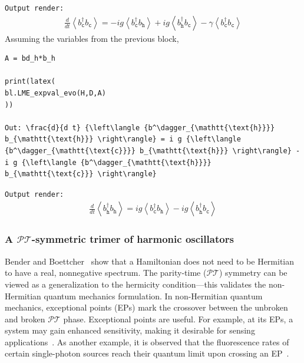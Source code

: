 \documentclass[onecolumn, 12pt, sort&compress]{elsarticle}
\newcommand{\inlinecode}[1]{\texttt{#1}}
\newenvironment{revision2}{%
\color{red}
}
{}
\begin{document}
\begin{revision2}
\inlinecode{Output render:}
\begin{align*}
\frac{d}{d t} {\left\langle {b^\dagger_{\mathtt{\text{c}}}} b_{\mathtt{\text{c}}} \right\rangle} = - i g {\left\langle {b^\dagger_{\mathtt{\text{c}}}} b_{\mathtt{\text{h}}} \right\rangle} + i g {\left\langle {b^\dagger_{\mathtt{\text{h}}}} b_{\mathtt{\text{c}}} \right\rangle} - \gamma {\left\langle {b^\dagger_{\mathtt{\text{c}}}} b_{\mathtt{\text{c}}} \right\rangle}
\end{align*}
\end{revision2}
Assuming the variables from the previous block, 
\begin{verbatim}
A = bd_h*b_h

print(latex(
bl.LME_expval_evo(H,D,A)
))

Out: \frac{d}{d t} {\left\langle {b^\dagger_{\mathtt{\text{h}}}} b_{\mathtt{\text{h}}} \right\rangle} = i g {\left\langle {b^\dagger_{\mathtt{\text{c}}}} b_{\mathtt{\text{h}}} \right\rangle} - i g {\left\langle {b^\dagger_{\mathtt{\text{h}}}} b_{\mathtt{\text{c}}} \right\rangle}
\end{verbatim}
\begin{revision2}
\inlinecode{Output render:}
\begin{align*}
\frac{d}{d t} {\left\langle {b^\dagger_{\mathtt{\text{h}}}} b_{\mathtt{\text{h}}} \right\rangle} = i g {\left\langle {b^\dagger_{\mathtt{\text{c}}}} b_{\mathtt{\text{h}}} \right\rangle} - i g {\left\langle {b^\dagger_{\mathtt{\text{h}}}} b_{\mathtt{\text{c}}} \right\rangle}
\end{align*}
\end{revision2}


\subsubsection{A $\mathcal{P}\mathcal{T}$-symmetric trimer of harmonic oscillators}

Bender and Boettcher~\cite{Bender1998} show that a Hamiltonian does not need to be Hermitian to have a real, nonnegative spectrum. The parity-time ($\mathcal{P}\mathcal{T}$) symmetry can be viewed as a generalization to the hermicity condition---this validates the non-Hermitian quantum mechanics formulation. In non-Hermitian quantum mechanics, exceptional points (EPs) mark the crossover between the unbroken and broken $\mathcal{P}\mathcal{T}$ phase. Exceptional points are useful. For example, at its EPs, a system may gain enhanced sensitivity, making it desirable for sensing applications~\cite{Wiersig2020}. As another example, it is observed that the fluorescence rates of certain single-photon sources reach their quantum limit upon crossing an EP~\cite{Zhou2024}. 
\end{document}
